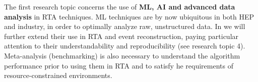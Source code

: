 
The first research topic concerns the use of \textbf{ML, AI and advanced data analysis} in RTA techniques.
ML techniques are by now ubiquitous in both HEP and industry, in order to optimally analyze raw, unstructured data. 
In \acronym we will further extend their use in RTA and event reconstruction, paying particular attention to their understandability and reproducibility (see research topic 4).   
Meta-analysis (benchmarking) is also necessary to understand the algorithm performance prior to using them in RTA and to satisfy he requirements of resource-constrained environments.

\begin{center}
\vskip-15pt
\end{center}

